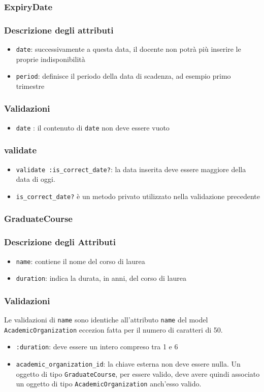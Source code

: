 \documentclass[11pt,a4paper]{article}
\begin{document}
\subsubsection{ExpiryDate}
\subsubsection*{Descrizione degli attributi}
\begin{itemize}
 \item \verb|date|: successivamente a questa data, il docente non potrà più inserire le proprie indisponibilità
\item \verb|period|: definisce il periodo della data di scadenza, ad esempio primo trimestre
\end{itemize}
\subsubsection*{Validazioni}
\begin{itemize}
 \item \verb|date| : il contenuto di \verb|date| non deve essere vuoto
\end{itemize}
\subsubsection*{validate}
\begin{itemize}
 \item \verb|validate :is_correct_date?|: la data inserita deve essere maggiore della data di oggi.
 \item \verb|is_correct_date?| è un metodo privato utilizzato nella validazione precedente
\end{itemize}

\subsubsection{GraduateCourse}
\subsubsection*{Descrizione degli Attributi}
\begin{itemize}
 \item \verb|name|: contiene il nome del corso di laurea
 \item \verb|duration|: indica la durata, in anni, del corso di laurea
\end{itemize}
\subsubsection*{Validazioni}
Le validazioni di \verb|name| sono identiche all'attributo \verb|name| del model \\ \verb|AcademicOrganization| eccezion fatta per il numero di caratteri di 50.
\begin{itemize}
\item \verb|:duration|: deve essere un intero compreso tra 1 e 6
\item \verb|academic_organization_id|: la chiave esterna non deve essere nulla. Un oggetto di tipo \verb|GraduateCourse|, per essere valido, deve avere quindi associato un oggetto di tipo \verb|AcademicOrganization| anch'esso valido.
\end{itemize}
\end{document}
